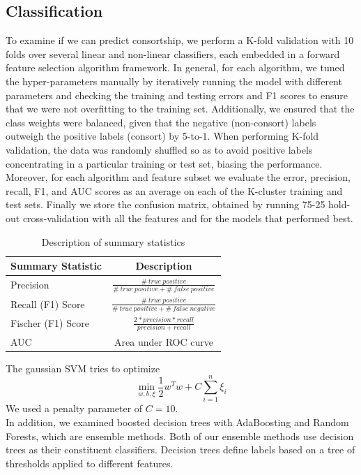 \documentclass[twoside,twocolumn,paper=letter,fontsize=11pt]{article}
\begin{document}
\subsection{Classification}
To examine if we can predict consortship, we perform a K-fold validation with 10
folds over several linear and non-linear classifiers, each embedded in a forward
feature selection algorithm framework. In general, for each algorithm, we tuned
the hyper-parameters manually by iteratively running the model with different
parameters and checking the training and testing errors and F1 scores to ensure
that we were not overfitting to the training set.  Additionally, we ensured that
the class weights were balanced, given that the negative (non-consort) labels
outweigh the positive labels (consort) by 5-to-1. When performing K-fold
validation, the data was randomly shuffled so as to avoid positive labels
concentrating in a particular training or test set, biasing the performance.
Moreover, for each algorithm and feature subset we evaluate the error,
precision, recall, F1, and AUC scores as an average on
each of the K-cluster training and test sets.  Finally we store the confusion
matrix, obtained by running 75-25 hold-out cross-validation with all the
features and for the models that performed best.
\begin{table}[h]
  \centering
  \begin{tabular}{|l|c|}
    \hline
    Summary Statistic & Description \\
    \hline
    Precision&
    $\frac{\#\ true\ positive}{\#\ true\ positive + \#\ false\ positive}$\\
    \hline
    Recall (F1) Score &
    $\frac{\#\ true\ positive}{\#\ true\ positive + \#\ false\ negative}$\\
    \hline
    Fischer (F1) Score &
    $\frac{2* precision* recall}{{precision}+{recall}}$\\
    \hline
    AUC &
    Area under ROC curve \\
    \hline
  \end{tabular}
  \caption{Description of summary statistics}
  \label{tbl:sum_stats}
\end{table}

 The gaussian SVM
tries to optimize \[\min_{w,b,\xi} \frac{1}{2} w^Tw + C \sum_{i=1}^{n} \xi_i\] 
We used a penalty parameter of
$C=10$.\\

In addition, we examined boosted decision trees with AdaBoosting and Random
Forests, which are ensemble methods. Both of our ensemble methods use decision
trees as their constituent classifiers. Decision trees define labels based on a
tree of thresholds applied to different features.\\
\end{document}

